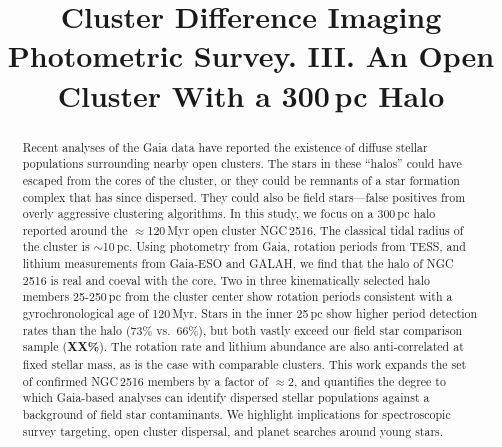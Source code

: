 \documentclass[12pt,twocolumn,tighten]{aastex63}
\begin{document}

\title{
  Cluster Difference Imaging Photometric Survey. III.
  An Open Cluster With a 300\,pc Halo
}



\begin{abstract}
  Recent analyses of the Gaia data have reported the existence of
  diffuse stellar populations surrounding nearby open clusters.  The
  stars in these ``halos'' could have escaped from the cores of the
  cluster, or they could be remnants of a star formation complex that
  has since dispersed.  They could also be field stars---false
  positives from overly aggressive clustering algorithms.  In this
  study, we focus on a 300\,pc halo reported
  around the $\approx$120\,Myr open cluster NGC\,2516.  The classical
  tidal radius of the cluster is $\sim$10\,pc.  Using photometry
  from Gaia, rotation periods from TESS, and lithium measurements from
  Gaia-ESO and GALAH, we find that the halo of NGC\,2516 is real and
  coeval with the core.  Two in three kinematically selected halo
  members 25-250\,pc from the cluster center show rotation periods
  consistent with a gyrochronological age of 120\,Myr.  Stars in the
  inner 25\,pc show higher period detection rates than the
  halo (73\% vs.\ 66\%), but both vastly exceed our field star
  comparison sample ({\bf XX\%}).  The rotation rate and lithium abundance
  are also anti-correlated at fixed stellar mass, as is the case with
  comparable clusters.  This work expands the set of confirmed
  NGC\,2516 members by a factor of $\approx$2, and quantifies the
  degree to which Gaia-based analyses can identify dispersed stellar
  populations against a background of field star contaminants.  We
  highlight implications for spectroscopic survey targeting, open
  cluster dispersal, and planet searches around young stars.
\end{abstract}



\end{document}
